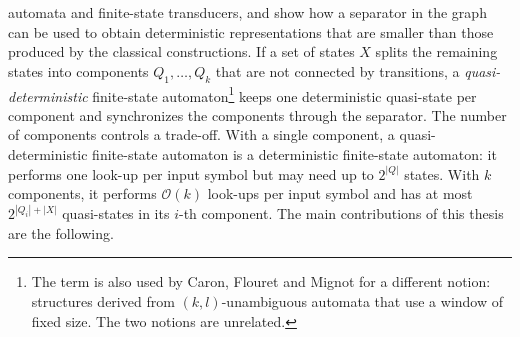 automata and finite-state transducers, and show how a separator in the graph can be
used to obtain deterministic representations that are smaller than those produced by
the classical constructions. If a set of states $X$ splits the remaining states into
components $Q_1, \ldots, Q_k$ that are not connected by transitions, a
\emph{quasi-deterministic} finite-state automaton\footnote{The term is also used by
Caron, Flouret and Mignot \cite{caron_flouret_mignot} for a different notion:
structures derived from $(k,l)$-unambiguous automata that use a window of fixed size.
The two notions are unrelated.} keeps one deterministic quasi-state per component and
synchronizes the components through the separator. The number of components controls a
trade-off. With a single component, a quasi-deterministic finite-state automaton is a
deterministic finite-state automaton: it performs one look-up per input symbol but may
need up to $2^{|Q|}$ states. With $k$ components, it performs $\mathcal{O}(k)$ look-ups
per input symbol and has at most $2^{|Q_i| + |X|}$ quasi-states in its $i$-th
component.
\bigbreak
The main contributions of this thesis are the following.
